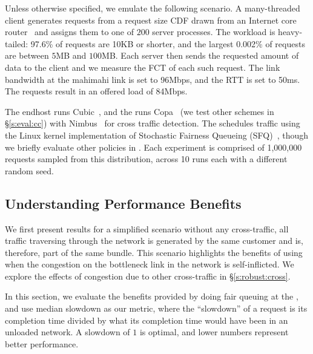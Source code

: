 Unless otherwise specified, we emulate the following scenario.
A many-threaded client generates requests from a request size CDF drawn from an Internet core router~\cite{caida-dataset} and assigns them to one of $200$ server processes.
The workload is heavy-tailed: 97.6\% of requests are 10KB or shorter, and the largest 0.002\% of requests are between $5$MB and $100$MB.
Each server then sends the requested amount of data to the client and we measure the FCT of each such request. 
The link bandwidth at the mahimahi link is set to 96Mbps, and the RTT is set to 50ms. The requests result in an offered load of 84Mbps. 

The endhost runs Cubic~\cite{cubic}, and the \inbox runs Copa~\cite{copa} (we test other schemes in \S\ref{s:eval:cc}) with Nimbus~\cite{nimbus-arxiv} for cross traffic detection.
The \inbox schedules traffic using the Linux kernel implementation of Stochastic Fairness Queueing (SFQ)~\cite{sfq}, though we briefly evaluate other policies in .
Each experiment is comprised of 1,000,000 requests sampled from this distribution, across 10 runs each with a different random seed.


\subsection{Understanding Performance Benefits}\label{s:eval:fct}

We first present results for a simplified scenario without any cross-traffic, \ie all traffic traversing through the network is generated by the same customer and is, therefore, part of the same bundle. 
This scenario highlights the benefits of using \name when the congestion on the bottleneck link in the network is self-inflicted. We explore the effects of congestion due to other cross-traffic in \S\ref{s:robust:cross}.


\newcommand{\baseline}{Status Quo\xspace}
\newcommand{\optimal}{In-Network\xspace}

In this section, we evaluate the benefits provided by doing fair queuing at the \name, and use median slowdown as our metric, where the ``slowdown'' of a request is its completion time divided by what its completion time would have been in an unloaded network. A slowdown of $1$ is optimal, and lower numbers represent better performance.

